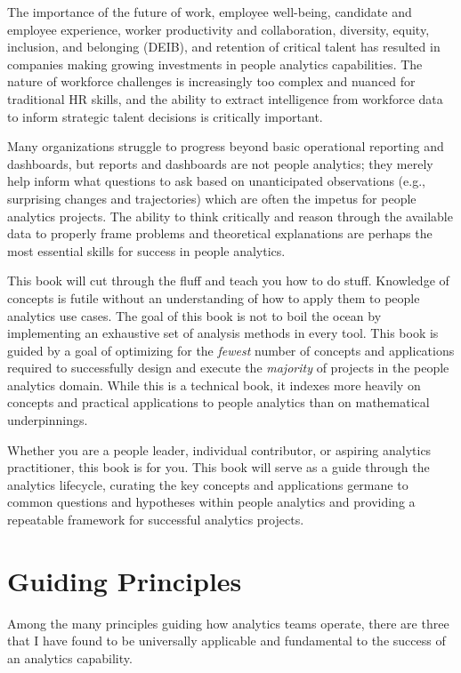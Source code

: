 \documentclass[
]{book}
\begin{document}
The importance of the future of work, employee well-being, candidate and employee experience, worker productivity and collaboration, diversity, equity, inclusion, and belonging (DEIB), and retention of critical talent has resulted in companies making growing investments in people analytics capabilities. The nature of workforce challenges is increasingly too complex and nuanced for traditional HR skills, and the ability to extract intelligence from workforce data to inform strategic talent decisions is critically important.

Many organizations struggle to progress beyond basic operational reporting and dashboards, but reports and dashboards are not people analytics; they merely help inform what questions to ask based on unanticipated observations (e.g., surprising changes and trajectories) which are often the impetus for people analytics projects. The ability to think critically and reason through the available data to properly frame problems and theoretical explanations are perhaps the most essential skills for success in people analytics.

This book will cut through the fluff and teach you how to do stuff. Knowledge of concepts is futile without an understanding of how to apply them to people analytics use cases. The goal of this book is not to boil the ocean by implementing an exhaustive set of analysis methods in every tool. This book is guided by a goal of optimizing for the \emph{fewest} number of concepts and applications required to successfully design and execute the \emph{majority} of projects in the people analytics domain. While this is a technical book, it indexes more heavily on concepts and practical applications to people analytics than on mathematical underpinnings.

Whether you are a people leader, individual contributor, or aspiring analytics practitioner, this book is for you. This book will serve as a guide through the analytics lifecycle, curating the key concepts and applications germane to common questions and hypotheses within people analytics and providing a repeatable framework for successful analytics projects.

\hypertarget{guiding-principles}{%
\section{Guiding Principles}\label{guiding-principles}}

Among the many principles guiding how analytics teams operate, there are three that I have found to be universally applicable and fundamental to the success of an analytics capability.
\end{document}
